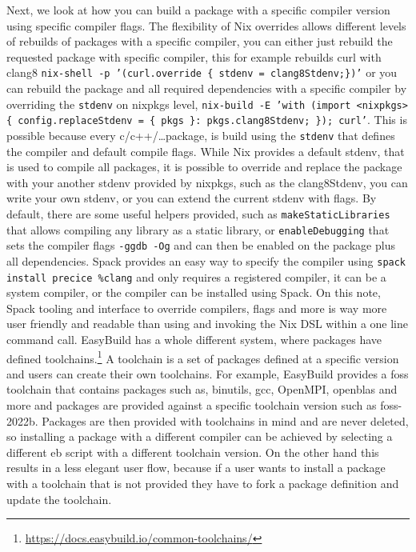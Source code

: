 \documentclass{eceasst}
\begin{document}
Next, we look at how you can build a package with a specific compiler version using specific compiler flags.
The flexibility of Nix overrides allows different levels of rebuilds of packages with a specific compiler, you can either just rebuild the requested package with specific compiler, this for example rebuilds curl with clang8 \texttt{nix-shell -p '(curl.override \{ stdenv = clang8Stdenv;\})'} or you can rebuild the package and all required dependencies with a specific compiler by overriding the \texttt{stdenv} on nixpkgs level, \texttt{nix-build -E 'with (import <nixpkgs> \{ config.replaceStdenv = \{ pkgs \}: pkgs.clang8Stdenv; \}); curl'}.
This is possible because every c/c++/\ldots package, is build using the \texttt{stdenv} that defines the compiler and default compile flags.
While Nix provides a default stdenv, that is used to compile all packages, it is possible to override and replace the package with your another stdenv provided by nixpkgs, such as the clang8Stdenv, you can write your own stdenv, or you can extend the current stdenv with flags.
By default, there are some useful helpers provided, such as \texttt{makeStaticLibraries} that allows compiling any library as a static library, or \texttt{enableDebugging} that sets the compiler flags \texttt{-ggdb -Og} and can then be enabled on the package plus all dependencies.
Spack provides an easy way to specify the compiler using \texttt{spack install precice \%clang} and only requires a registered compiler, it can be a system compiler, or the compiler can be installed using Spack.
On this note, Spack tooling and interface to override compilers, flags and more is way more user friendly and readable than using and invoking the Nix DSL within a one line command call.
EasyBuild has a whole different system, where packages have defined toolchains.\footnote{\url{https://docs.easybuild.io/common-toolchains/}}
A toolchain is a set of packages defined at a specific version and users can create their own toolchains.
For example, EasyBuild provides a foss toolchain that contains packages such as, binutils, gcc, OpenMPI, openblas and more and packages are provided against a specific toolchain version such as foss-2022b.
Packages are then provided with toolchains in mind and are never deleted, so installing a package with a different compiler can be achieved by selecting a different eb script with a different toolchain version.
On the other hand this results in a less elegant user flow, because if a user wants to install a package with a toolchain that is not provided they have to fork a package definition and update the toolchain.\\
\end{document}
